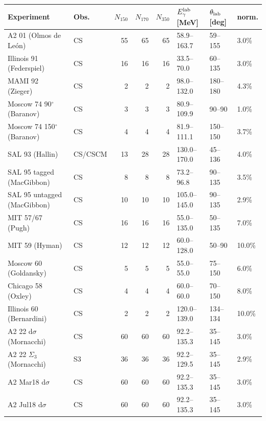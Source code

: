 \begin{tabular}{llrrrlll}
\hline
Experiment & Obs. & $N_{150}$ & $N_{170}$ & $N_{350}$ & $E_\gamma^{\rm lab}$ [MeV] & $\theta_{\rm lab}$ [deg] & norm. \\
\hline
A2 01 (Olmos de León)~\cite{deLeon:2001dnx} & CS & 55 & 65 & 65 & 58.9--163.7 & 59--155 & 3.0\% \\
Illinois 91 (Federspiel)~\cite{Federspiel:1991yd} & CS & 16 & 16 & 16 & 33.5--70.0 & 60--135 & 3.0\% \\
MAMI 92 (Zieger)~\cite{Zieger:1992jq} & CS & 2 & 2 & 2 & 98.0--132.0 & 180--180 & 4.3\% \\
Moscow 74 90$^\circ$ (Baranov)~\cite{Baranov:1974ec,Baranov:1975ju} & CS & 3 & 3 & 3 & 80.9--109.9 & 90--90 & 1.0\% \\
Moscow 74 150$^\circ$ (Baranov)~\cite{Baranov:1974ec,Baranov:1975ju} & CS & 4 & 4 & 4 & 81.9--111.1 & 150--150 & 3.7\% \\
SAL 93 (Hallin)~\cite{Hallin:1993ft} & CS/CSCM & 13 & 28 & 28 & 130.0--170.0 & 45--136 & 4.0\% \\
SAL 95 tagged (MacGibbon)~\cite{MacGibbon:1995in} & CS & 8 & 8 & 8 & 73.2--96.8 & 90--135 & 3.5\% \\
SAL 95 untagged (MacGibbon)~\cite{MacGibbon:1995in} & CS & 10 & 10 & 10 & 105.0--145.0 & 90--135 & 2.9\% \\
MIT 57/67 (Pugh)~\cite{Pugh:1957zz} & CS & 16 & 16 & 16 & 55.0--135.0 & 50--135 & 7.0\% \\
MIT 59 (Hyman)~\cite{Hyman:1959zz} & CS & 12 & 12 & 12 & 60.0--128.0 & 50--90 & 10.0\% \\
Moscow 60 (Goldansky)~\cite{Goldansky:1960} & CS & 5 & 5 & 5 & 55.0--55.0 & 75--150 & 6.0\% \\
Chicago 58 (Oxley)~\cite{Oxley:1958zz} & CS & 4 & 4 & 4 & 60.0--60.0 & 70--150 & 8.0\% \\
Illinois 60 (Bernardini)~\cite{Bernardini:1960wya} & CS & 2 & 2 & 2 & 120.0--139.0 & 134--134 & 10.0\% \\
A2 22 d$\sigma$ (Mornacchi)~\cite{A2:2021wmm} & CS & 60 & 60 & 60 & 92.2--135.3 & 35--145 & 3.0\% \\
A2 22 $\Sigma_{3}$ (Mornacchi)~\cite{A2:2021wmm} & S3 & 36 & 36 & 36 & 92.2--129.5 & 35--145 & 2.9\% \\
A2 Mar18 d$\sigma$~\cite{Mornacchi thesis} & CS & 60 & 60 & 60 & 92.2--135.3 & 35--145 & 3.0\% \\
A2 Jul18 d$\sigma$~\cite{Mornacchi thesis} & CS & 60 & 60 & 60 & 92.2--135.3 & 35--145 & 3.0\% \\

\end{tabular}
